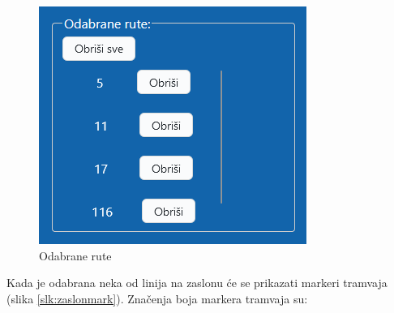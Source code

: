 \documentclass[zavrsnirad]{fer}
\begin{document}
\begin{figure}[H]
\begin{minipage}[c]{0.3\textwidth}
		\includegraphics[width=\textwidth]{Figures/odabrani.png}
		\caption{Odabrane rute}
		\label{slk:odabrane}
	\end{minipage}
\end{figure}
\newpage
Kada je odabrana neka od linija na zaslonu će se prikazati markeri tramvaja (slika \ref{slk:zaslonmark}). 
Značenja boja markera tramvaja su:
\end{document}
